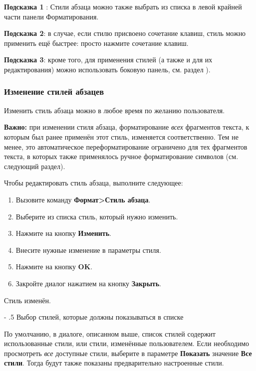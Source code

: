 ﻿\documentclass[a4paper,10pt]{article}
\makeatletter
\renewcommand\paragraph{%
   \@startsection{paragraph}{4}{0mm}%
      {-\baselineskip}%
      {.5\baselineskip}%
      {\normalfont\normalsize\bfseries}}
\makeatother
\begin{document}
\begin{mdframed}[backgroundcolor=blue!10]
\textbf{Подсказка 1 }: Стили абзаца можно также выбрать из списка в левой крайней части панели Форматирования.

\textbf{Подсказка 2}: в случае, если стилю присвоено сочетание клавиш, стиль можно применить ещё быстрее: просто нажмите сочетание клавиш.

\textbf{Подсказка 3}: кроме того, для применения стилей (а также и для их редактирования) можно использовать боковую панель, см. раздел ).
\end{mdframed}

\subsubsection{Изменение стилей абзацев}
Изменить стиль абзаца можно в любое время по желанию пользователя.

\begin{mdframed}[backgroundcolor=blue!10]
\textbf{Важно:} при изменении стиля абзаца, форматирование \textit{всех} фрагментов текста, к которым был ранее применён этот стиль, изменяется соответственно. Тем не менее, это автоматическое переформатирование ограничено для тех фрагментов текста, в которых также применялось ручное форматирование символов (см. следующий раздел).
\end{mdframed}

Чтобы редактировать стиль абзаца, выполните следующее:
\begin{enumerate}
 \item Вызовите команду \textbf{Формат>Стиль абзаца}.
 \item Выберите из списка стиль, который нужно изменить.
 \item Нажмите на кнопку \textbf{Изменить}.
 \item Внесите нужные изменение в параметры стиля.
 \item Нажмите на кнопку \textbf{OK}.
 \item Закройте диалог нажатием на кнопку \textbf{Закрыть}.
\end{enumerate}

Стиль изменён.

\paragraph{Выбор стилей, которые должны показываться в списке}

По умолчанию, в диалоге, описанном выше, список стилей содержит использованные стили, или стили, изменённые пользователем. Если необходимо просмотреть \textit{все} доступные стили, выберите в параметре \textbf{Показать} значение \textbf{Все стили}. Тогда будут также показаны предварительно настроенные стили.
\end{document}
